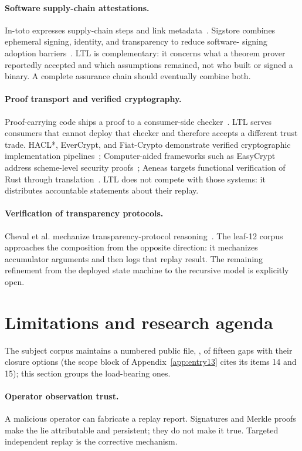\documentclass[11pt]{article}
\theoremstyle{remark}
\newcommand{\code}[1]{\texttt{\detokenize{#1}}}
\begin{document}
\paragraph{Software supply-chain attestations.}
In-toto expresses supply-chain steps and link metadata~\cite{intoto}. Sigstore
combines ephemeral signing, identity, and transparency to reduce software-
signing adoption barriers~\cite{sigstore}. LTL is complementary: it concerns
what a theorem prover reportedly accepted and which assumptions remained, not
who built or signed a binary. A complete assurance chain should eventually
combine both.

\paragraph{Proof transport and verified cryptography.}
Proof-carrying code ships a proof to a consumer-side checker~\cite{pcc}. LTL
serves consumers that cannot deploy that checker and therefore accepts a
different trust trade. HACL*, EverCrypt, and Fiat-Crypto demonstrate verified
cryptographic implementation pipelines~\cite{hacl,evercrypt,fiatcrypto};
Computer-aided frameworks such as EasyCrypt address scheme-level security
proofs~\cite{easycrypt}; Aeneas targets functional verification of Rust
through translation~\cite{aeneas}.
LTL does not compete with those systems: it distributes accountable statements
about their replay.

\paragraph{Verification of transparency protocols.}
Cheval et al. mechanize transparency-protocol reasoning~\cite{cheval}.
The leaf-12 corpus approaches the composition from the opposite direction: it
mechanizes accumulator arguments and then logs that replay result. The
remaining refinement from the deployed state machine to the recursive model is
explicitly open.

\section{Limitations and research agenda}\label{sec:limitations}

The subject corpus maintains a numbered public file, \code{KNOWN-GAPS},
of fifteen gaps with their closure options (the scope block of
Appendix~\ref{app:entry13} cites its items 14 and 15); this section groups the load-bearing ones.

\paragraph{Operator observation trust.}
A malicious operator can fabricate a replay report. Signatures and Merkle
proofs make the lie attributable and persistent; they do not make it true.
Targeted independent replay is the corrective mechanism.
\end{document}
